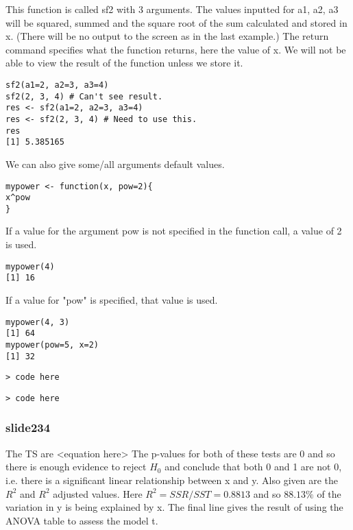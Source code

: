 \documentclass[a4paper,12pt]{article}
\begin{document}
\begin{itemize}
This function is called sf2 with 3 arguments. The values inputted for a1, a2, a3 will be squared, summed and the square root of the sum calculated and stored in x. (There will be no output to the screen as in the last example.)
The return command specifies what the function returns, here the value of x. We will not be able to view the result of the function unless we store it.
\begin{verbatim}sf2(a1=2, a2=3, a3=4)
sf2(2, 3, 4) # Can't see result.
res <- sf2(a1=2, a2=3, a3=4)
res <- sf2(2, 3, 4) # Need to use this.
res
[1] 5.385165
\end{verbatim}
We can also give some/all arguments default values.
\begin{verbatim}mypower <- function(x, pow=2){
x^pow
}
\end{verbatim}
If a value for the argument pow is not specified in the function call,
a value of 2 is used.
\begin{verbatim}mypower(4)
[1] 16
\end{verbatim}
If a value for "pow" is specified, that value is used.
\begin{verbatim}
mypower(4, 3)
[1] 64
mypower(pow=5, x=2)
[1] 32
\end{verbatim}










\footnotesize \begin{verbatim}
> code here
 \end{verbatim}\normalsize


\footnotesize \begin{verbatim}
> code here
 \end{verbatim}\normalsize



\subsubsection{slide234}
The TS are <equation here>  
The p-values for both of these tests are 0 and so there is enough evidence to reject $H_0$ and conclude that both 0 and 1 are not 0, i.e. there is a significant linear relationship between x and y. 
Also given are the $R^2$ and $R^2$ adjusted values. Here $R^2 = SSR/SST = 0.8813$ and so $88.13\%$ of the variation in y is being explained by x. 
The final line gives the result of using the ANOVA table to assess the model t.


\end{itemize}
\end{document}
